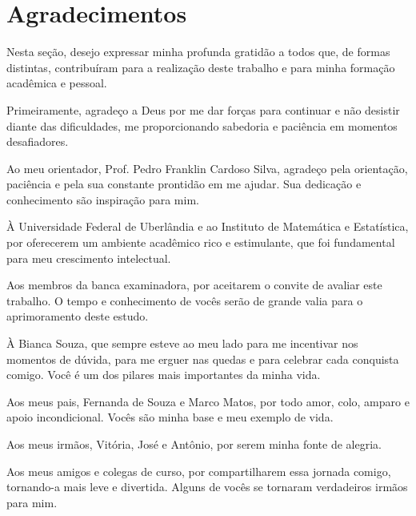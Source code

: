 
\chapter*{Agradecimentos}
\thispagestyle{empty}


Nesta seção, desejo expressar minha profunda gratidão a todos que, de formas distintas, contribuíram para a realização deste trabalho e para minha formação acadêmica e pessoal.

Primeiramente, agradeço a Deus por me dar forças para continuar e não desistir diante das dificuldades, me proporcionando sabedoria e paciência em momentos desafiadores.

Ao meu orientador, Prof. Pedro Franklin Cardoso Silva, agradeço pela orientação, paciência e pela sua constante prontidão em me ajudar. Sua dedicação e conhecimento são inspiração para mim.

À Universidade Federal de Uberlândia e ao Instituto de Matemática e Estatística, por oferecerem um ambiente acadêmico rico e estimulante, que foi fundamental para meu crescimento intelectual.

Aos membros da banca examinadora, por aceitarem o convite de avaliar este trabalho. O tempo e conhecimento de vocês serão de grande valia para o aprimoramento deste estudo.

À Bianca Souza, que sempre esteve ao meu lado para me incentivar nos momentos de dúvida, para me erguer nas quedas e para celebrar cada conquista comigo. Você é um dos pilares mais importantes da minha vida.

Aos meus pais, Fernanda de Souza e Marco Matos, por todo amor, colo, amparo e apoio incondicional. Vocês são minha base e meu exemplo de vida.

Aos meus irmãos, Vitória, José e Antônio, por serem minha fonte de alegria.

Aos meus amigos e colegas de curso, por compartilharem essa jornada comigo, tornando-a mais leve e divertida. Alguns de vocês se tornaram verdadeiros irmãos para mim.